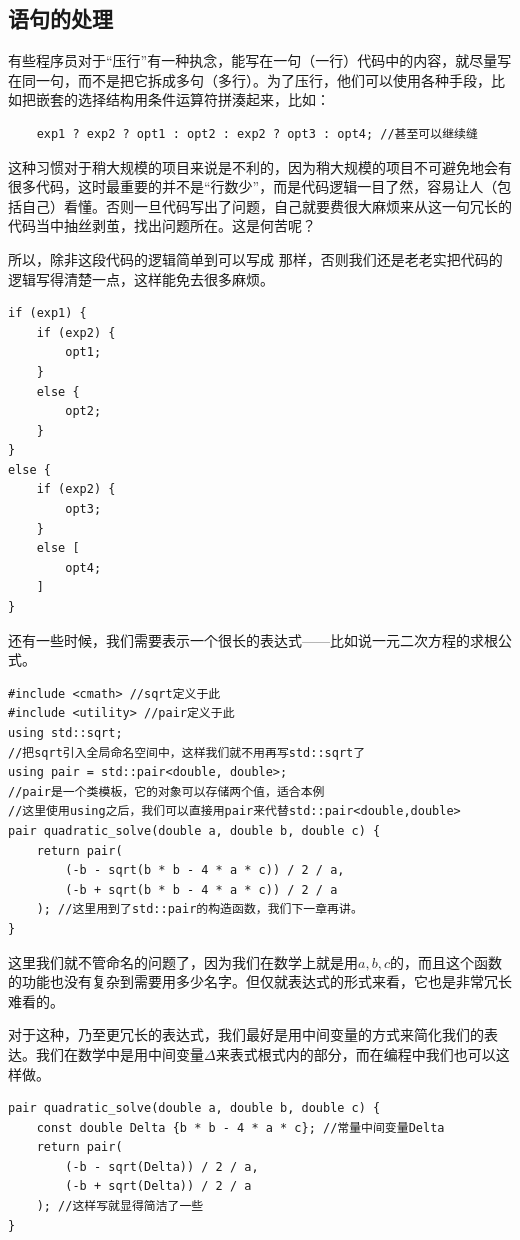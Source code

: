 \subsection*{语句的处理}
有些程序员对于``压行''有一种执念，能写在一句（一行）代码中的内容，就尽量写在同一句，而不是把它拆成多句（多行）。为了压行，他们可以使用各种手段，比如把嵌套的选择结构用条件运算符拼湊起来，比如：
\begin{lstlisting}
    exp1 ? exp2 ? opt1 : opt2 : exp2 ? opt3 : opt4; //甚至可以继续缝
\end{lstlisting}\par
这种习惯对于稍大规模的项目来说是不利的，因为稍大规模的项目不可避免地会有很多代码，这时最重要的并不是``行数少''，而是代码逻辑一目了然，容易让人（包括自己）看懂。否则一旦代码写出了问题，自己就要费很大麻烦来从这一句冗长的代码当中抽丝剥茧，找出问题所在。这是何苦呢？\par
所以，除非这段代码的逻辑简单到可以写成 \lstinline@max@ 那样，否则我们还是老老实把代码的逻辑写得清楚一点，这样能免去很多麻烦。
\begin{lstlisting}
if (exp1) {
    if (exp2) {
        opt1;
    }
    else {
        opt2;
    }
}
else {
    if (exp2) {
        opt3;
    }
    else [
        opt4;
    ]
}
\end{lstlisting}\par
还有一些时候，我们需要表示一个很长的表达式——比如说一元二次方程的求根公式。
\begin{lstlisting}
#include <cmath> //sqrt定义于此
#include <utility> //pair定义于此
using std::sqrt;
//把sqrt引入全局命名空间中，这样我们就不用再写std::sqrt了
using pair = std::pair<double, double>;
//pair是一个类模板，它的对象可以存储两个值，适合本例
//这里使用using之后，我们可以直接用pair来代替std::pair<double,double>
pair quadratic_solve(double a, double b, double c) {
    return pair(
        (-b - sqrt(b * b - 4 * a * c)) / 2 / a,
        (-b + sqrt(b * b - 4 * a * c)) / 2 / a
    ); //这里用到了std::pair的构造函数，我们下一章再讲。
}
\end{lstlisting}
这里我们就不管命名的问题了，因为我们在数学上就是用$a,b,c$的，而且这个函数的功能也没有复杂到需要用多少名字。但仅就表达式的形式来看，它也是非常冗长难看的。\par
对于这种，乃至更冗长的表达式，我们最好是用中间变量的方式来简化我们的表达。我们在数学中是用中间变量$\Delta$来表式根式内的部分，而在编程中我们也可以这样做。
\begin{lstlisting}
pair quadratic_solve(double a, double b, double c) {
    const double Delta {b * b - 4 * a * c}; //常量中间变量Delta
    return pair(
        (-b - sqrt(Delta)) / 2 / a,
        (-b + sqrt(Delta)) / 2 / a
    ); //这样写就显得简洁了一些
}
\end{lstlisting}\par
